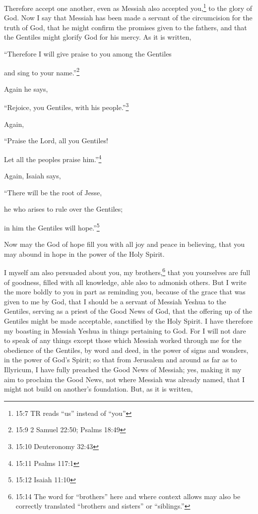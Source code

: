 \myverse{}Therefore accept one another, even as Messiah also accepted you,\footnote{15:7 TR reads “us” instead of “you”} to the glory of God.
\myverse{}Now I say that Messiah has been made a servant of the circumcision for the
truth of God, that he might confirm the promises given to the fathers,
\myverse{}and that the Gentiles might glorify God for his mercy. As it is written,

“Therefore I will give praise to you among the Gentiles

and sing to your name.”\footnote{15:9 2 Samuel 22:50;
	Psalms 18:49}

\myverse{}Again he says,

“Rejoice, you Gentiles, with his people.”\footnote{15:10 Deuteronomy 32:43}

\myverse{}Again,

“Praise the Lord, all you Gentiles!

Let all the peoples praise him.”\footnote{15:11 Psalms 117:1}

\myverse{}Again, Isaiah says,

“There will be the root of Jesse,

he who arises to rule over the Gentiles;

in him the Gentiles will hope.”\footnote{15:12 Isaiah 11:10}

\myverse{}Now may the God of hope fill you with all joy and peace in believing,
that you may abound in hope in the power of the Holy Spirit.

\myverse{}I myself am also persuaded about you, my brothers,\footnote{15:14 The word for “brothers” here and where context allows may also be correctly translated “brothers
	and sisters” or “siblings.”} that you yourselves are full of goodness, filled with all knowledge,
able also to admonish others.
\myverse{}But I write the more boldly to you in part as reminding you, because of the
grace that was given to me by God,
\myverse{}that I should be a servant of Messiah Yeshua to the Gentiles, serving as
a priest of the Good News of God, that the offering up of the Gentiles might be made acceptable, sanctified
by the Holy Spirit.
\myverse{}I have therefore my boasting in Messiah Yeshua in things pertaining to God.
\myverse{}For I will not dare to speak of any things except those which Messiah worked
through me for the obedience of the Gentiles, by word and deed,
\myverse{}in the power of signs and wonders, in the power of God’s Spirit; so that
from Jerusalem and around as far as to Illyricum, I have fully preached the Good News of Messiah;
\myverse{}yes, making it my aim to proclaim the Good News, not where Messiah was already
named, that I might not build on another’s foundation.
\myverse{}But, as it is written,

